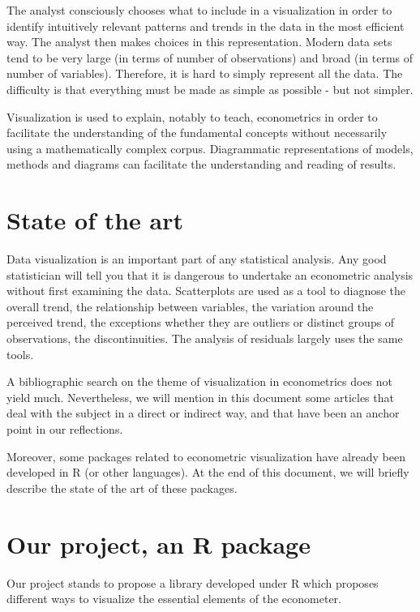 \documentclass[
]{report}
\begin{document}
The analyst consciously chooses what to include in a visualization in order to identify intuitively relevant patterns and trends in the data in the most efficient way. The analyst then makes choices in this representation. Modern data sets tend to be very large (in terms of number of observations) and broad (in terms of number of variables). Therefore, it is hard to simply represent all the data. The difficulty is that everything must be made as simple as possible - but not simpler.

Visualization is used to explain, notably to teach, econometrics in order to facilitate the understanding of the fundamental concepts without necessarily using a mathematically complex corpus.
Diagrammatic representations of models, methods and diagrams can facilitate the understanding and reading of results.

\hypertarget{state-of-the-art}{%
\section{State of the art}\label{state-of-the-art}}

Data visualization is an important part of any statistical analysis. Any good statistician will tell you that it is dangerous to undertake an econometric analysis without first examining the data.
Scatterplots are used as a tool to diagnose the overall trend, the relationship between variables, the variation around the perceived trend, the exceptions whether they are outliers or distinct groups of observations, the discontinuities. The analysis of residuals largely uses the same tools.

A bibliographic search on the theme of visualization in econometrics does not yield much. Nevertheless, we will mention in this document some articles that deal with the subject in a direct or indirect way, and that have been an anchor point in our reflections.

Moreover, some packages related to econometric visualization have already been developed in R (or other languages). At the end of this document, we will briefly describe the state of the art of these packages.

\hypertarget{our-project-an-r-package}{%
\section{Our project, an R package}\label{our-project-an-r-package}}

Our project stands to propose a library developed under R which proposes different ways to visualize the essential elements of the econometer.
\end{document}
